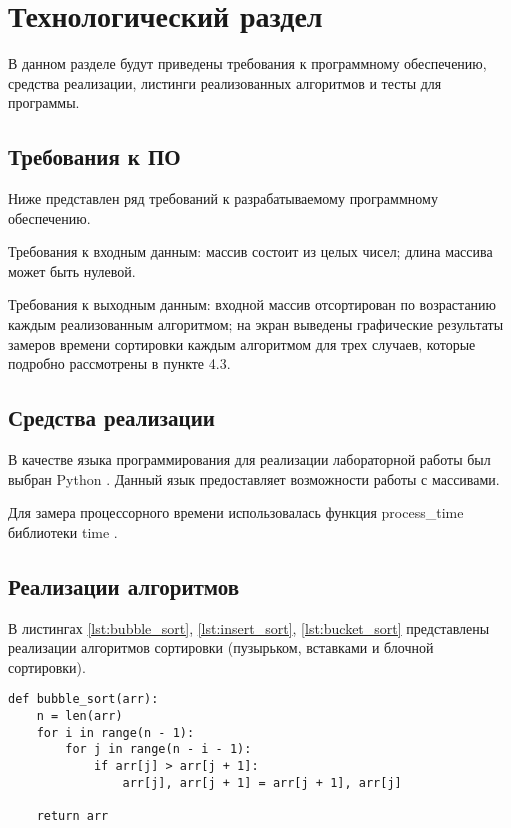 \section{Технологический раздел}

В данном разделе будут приведены требования к программному обеспечению, средства реализации, листинги реализованных алгоритмов и тесты для программы.

\subsection{Требования к ПО}

Ниже представлен ряд требований к разрабатываемому программному обеспечению.

Требования к входным данным: массив состоит из целых чисел; длина массива может быть нулевой.

Требования к выходным данным: входной массив отсортирован по возрастанию каждым реализованным алгоритмом; на экран выведены графические результаты замеров времени сортировки каждым алгоритмом для трех случаев, которые подробно рассмотрены в пункте 4.3.

\subsection{Средства реализации}

В качестве языка программирования для реализации лабораторной работы был выбран Python \cite{PythonBook}. 
Данный язык предоставляет возможности работы с массивами.

Для замера процессорного времени использовалась функция process\_time библиотеки time \cite{process_time_text}.


\subsection{Реализации алгоритмов}
В листингах \ref{lst:bubble_sort}, \ref{lst:insert_sort}, \ref{lst:bucket_sort} представлены реализации алгоритмов сортировки (пузырьком, вставками и блочной сортировки). \newpage

\begin{lstlisting}[label=lst:bubble_sort,caption=Алгоритм сортировки пузырьком]
def bubble_sort(arr):
    n = len(arr)
    for i in range(n - 1):
        for j in range(n - i - 1):
            if arr[j] > arr[j + 1]:
                arr[j], arr[j + 1] = arr[j + 1], arr[j]
                
    return arr
\end{lstlisting}

